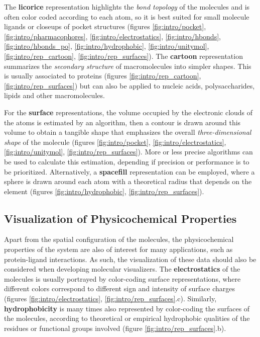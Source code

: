     The \textbf{licorice} representation highlights the \textit{bond topology} of the molecules and is often color coded according to each atom, so it is best suited for small molecule ligands or closeups of pocket structures (figures \ref{fig:intro/pocket}, \ref{fig:intro/pharmacophores}, \ref{fig:intro/electrostatics}, \ref{fig:intro/hbonds}, \ref{fig:intro/hbonds_po}, \ref{fig:intro/hydrophobic}, \ref{fig:intro/unitymol}, \ref{fig:intro/rep_cartoon}, \ref{fig:intro/rep_surfaces}). The \textbf{cartoon} representation summarizes the \textit{secondary structure} of macromolecules into simpler shapes. This is usually associated to proteins (figures \ref{fig:intro/rep_cartoon}, \ref{fig:intro/rep_surfaces}) but can also be applied to nucleic acids, polysaccharides, lipids and other macromolecules.

    For the \textbf{surface} representations, the volume occupied by the electronic clouds of the atoms is estimated by an algorithm, then a contour is drawn around this volume to obtain a tangible shape that emphasizes the overall \textit{three-dimensional shape} of the molecule (figures \ref{fig:intro/pocket}, \ref{fig:intro/electrostatics}, \ref{fig:intro/unitymol}, \ref{fig:intro/rep_surfaces}). More or less precise algorithms can be used to calculate this estimation, depending if precision or performance is to be prioritized. Alternatively, a \textbf{spacefill} representation can be employed, where a sphere is drawn around each atom with a theoretical radius that depends on the element (figures \ref{fig:intro/hydrophobic}, \ref{fig:intro/rep_surfaces}).

  \subsection{Visualization of Physicochemical Properties}
    Apart from the spatial configuration of the molecules, the physicochemical properties of the system are also of interest for many applications, such as protein-ligand interactions. As such, the visualization of these data should also be considered when developing molecular visualizers. The \textbf{electrostatics} of the molecules is usually portrayed by color-coding surface representations, where different colors correspond to different sign and intensity of surface charges (figures \ref{fig:intro/electrostatics}, \ref{fig:intro/rep_surfaces}.c). Similarly, \textbf{hydrophobicity} is many times also represented by color-coding the surfaces of the molecules, according to theoretical or empirical hydrophobic qualities of the residues or functional groups involved (figure \ref{fig:intro/rep_surfaces}.b).

